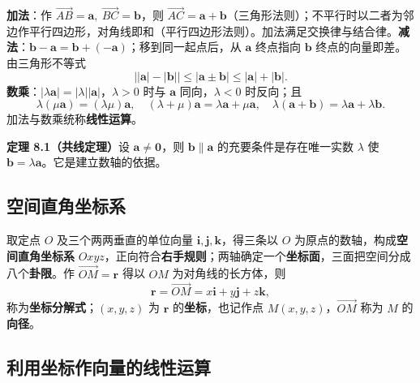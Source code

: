 \textbf{加法}：作 $\overrightarrow{AB}=\boldsymbol a,\ \overrightarrow{BC}=\boldsymbol b$，则 $\overrightarrow{AC}=\boldsymbol a+\boldsymbol b$（三角形法则）；不平行时以二者为邻边作平行四边形，对角线即和（平行四边形法则）。加法满足交换律与结合律。\textbf{减法}：$\boldsymbol b-\boldsymbol a=\boldsymbol b+(-\boldsymbol a)$；移到同一起点后，从 $\boldsymbol a$ 终点指向 $\boldsymbol b$ 终点的向量即差。由三角形不等式
\begin{equation}
\bigl||\boldsymbol a|-|\boldsymbol b|\bigr|\le|\boldsymbol a\pm\boldsymbol b|\le|\boldsymbol a|+|\boldsymbol b| .
\end{equation}
\textbf{数乘}：$|\lambda\boldsymbol a|=|\lambda||\boldsymbol a|$，$\lambda>0$ 时与 $\boldsymbol a$ 同向，$\lambda<0$ 时反向；且
\begin{equation}
\lambda(\mu\boldsymbol a)=(\lambda\mu)\boldsymbol a,\quad
(\lambda+\mu)\boldsymbol a=\lambda\boldsymbol a+\mu\boldsymbol a,\quad
\lambda(\boldsymbol a+\boldsymbol b)=\lambda\boldsymbol a+\lambda\boldsymbol b .
\end{equation}
加法与数乘统称\textbf{线性运算}。


\textbf{定理 8.1（共线定理）}\quad 设 $\boldsymbol a\neq\boldsymbol 0$，则 $\boldsymbol b\parallel\boldsymbol a$ 的充要条件是存在唯一实数 $\lambda$ 使 $\boldsymbol b=\lambda\boldsymbol a$。它是建立数轴的依据。

\subsection{空间直角坐标系}

取定点 $O$ 及三个两两垂直的单位向量 $\boldsymbol i,\boldsymbol j,\boldsymbol k$，得三条以 $O$ 为原点的数轴，构成\textbf{空间直角坐标系} $Oxyz$，正向符合\textbf{右手规则}；两轴确定一个\textbf{坐标面}，三面把空间分成八个\textbf{卦限}。作 $\overrightarrow{OM}=\boldsymbol r$ 得以 $OM$ 为对角线的长方体，则
\begin{equation}
\boldsymbol r=\overrightarrow{OM}=x\boldsymbol i+y\boldsymbol j+z\boldsymbol k ,
\end{equation}
称为\textbf{坐标分解式}；$(x,y,z)$ 为 $\boldsymbol r$ 的\textbf{坐标}，也记作点 $M(x,y,z)$，$\overrightarrow{OM}$ 称为 $M$ 的\textbf{向径}。

\subsection{利用坐标作向量的线性运算}

